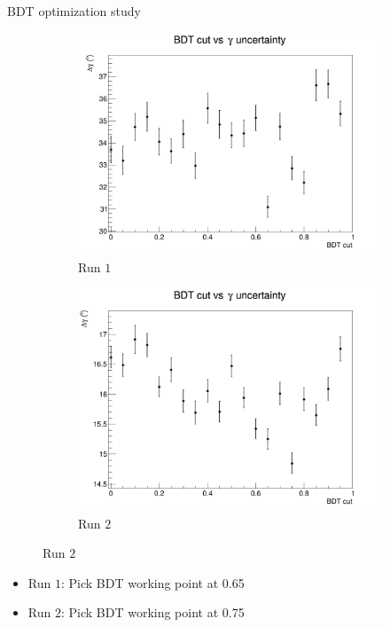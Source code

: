\documentclass{beamer}
\begin{document}
\begin{frame}{BDT optimization study}
  \begin{figure}
    \centering
    \vspace{-0.2cm}
    \begin{subfigure}{0.5\textwidth}
      \includegraphics[width = 1.0\textwidth]{Plots/BDTCutVersusGammaErrorRun1.png}
      \caption{Run $1$}
    \end{subfigure}%
    \begin{subfigure}{0.5\textwidth}
      \includegraphics[width = 1.0\textwidth]{Plots/BDTCutVersusGammaErrorRun2.png}
      \caption{Run $2$}
    \end{subfigure}
  \end{figure}
  \begin{itemize}
    \item{Run $1$: Pick BDT working point at 0.65}
    \item{Run $2$: Pick BDT working point at 0.75}
  \end{itemize}
\end{frame}
\end{document}
